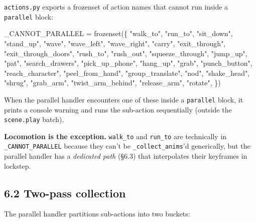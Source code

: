 \documentclass[
  11pt,
]{book}
\newenvironment{Shaded}{}{}
\newcommand{\BuiltInTok}[1]{\textcolor[rgb]{0.00,0.50,0.00}{#1}}
\newcommand{\NormalTok}[1]{#1}
\newcommand{\OperatorTok}[1]{\textcolor[rgb]{0.40,0.40,0.40}{#1}}
\newcommand{\StringTok}[1]{\textcolor[rgb]{0.25,0.44,0.63}{#1}}
\begin{document}
\texttt{actions.py} exports a frozenset of action names that cannot run
inside a \texttt{parallel} block:

\begin{Shaded}
\begin{Highlighting}[]
\NormalTok{\_CANNOT\_PARALLEL }\OperatorTok{=} \BuiltInTok{frozenset}\NormalTok{(\{}
    \StringTok{"walk\_to"}\NormalTok{, }\StringTok{"run\_to"}\NormalTok{, }\StringTok{"sit\_down"}\NormalTok{, }\StringTok{"stand\_up"}\NormalTok{, }\StringTok{"wave"}\NormalTok{,}
    \StringTok{"wave\_left"}\NormalTok{, }\StringTok{"wave\_right"}\NormalTok{, }\StringTok{"carry"}\NormalTok{, }\StringTok{"exit\_through"}\NormalTok{,}
    \StringTok{"exit\_through\_doors"}\NormalTok{, }\StringTok{"rush\_to"}\NormalTok{, }\StringTok{"rush\_out"}\NormalTok{, }\StringTok{"squeeze\_through"}\NormalTok{,}
    \StringTok{"jump\_up"}\NormalTok{, }\StringTok{"pat"}\NormalTok{, }\StringTok{"search\_drawers"}\NormalTok{, }\StringTok{"pick\_up\_phone"}\NormalTok{, }\StringTok{"hang\_up"}\NormalTok{,}
    \StringTok{"grab"}\NormalTok{, }\StringTok{"punch\_button"}\NormalTok{, }\StringTok{"reach\_character"}\NormalTok{, }\StringTok{"peel\_from\_hand"}\NormalTok{,}
    \StringTok{"group\_translate"}\NormalTok{, }\StringTok{"nod"}\NormalTok{, }\StringTok{"shake\_head"}\NormalTok{, }\StringTok{"shrug"}\NormalTok{,}
    \StringTok{"grab\_arm"}\NormalTok{, }\StringTok{"twist\_arm\_behind"}\NormalTok{, }\StringTok{"release\_arm"}\NormalTok{, }\StringTok{"rotate"}\NormalTok{,}
\NormalTok{\})}
\end{Highlighting}
\end{Shaded}

When the parallel handler encounters one of these inside a
\texttt{parallel} block, it prints a console warning and runs the
sub-action sequentially (outside the \texttt{scene.play} batch).

\textbf{Locomotion is the exception.} \texttt{walk\_to} and
\texttt{run\_to} are technically in \texttt{\_CANNOT\_PARALLEL} because
they can't be \texttt{\_collect\_anims}'d generically, but the parallel
handler has a \emph{dedicated path} (§6.3) that interpolates their
keyframes in lockstep.

\subsection{6.2 Two-pass collection}\label{two-pass-collection}

The parallel handler partitions sub-actions into two buckets:
\end{document}
